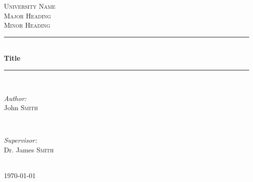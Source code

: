 \documentclass[12pt]{article} %
\begin{document}

\begin{titlepage}

\newcommand{\HRule}{\rule{\linewidth}{0.5mm}} %

\center %

\textsc{\LARGE University Name}\\[1.5cm] %
\textsc{\Large Major Heading}\\[0.5cm] %
\textsc{\large Minor Heading}\\[0.5cm] %

\HRule \\[0.4cm]
{ \huge \bfseries Title}\\[0.4cm] %
\HRule \\[1.5cm]

\begin{minipage}{0.4\textwidth}
\begin{flushleft} \large
\emph{Author:}\\
John \textsc{Smith} %
\end{flushleft}
\end{minipage}
~
\begin{minipage}{0.4\textwidth}
\begin{flushright} \large
\emph{Supervisor:} \\
Dr. James \textsc{Smith} %
\end{flushright}
\end{minipage}\\[4cm]

{\large \today}\\[3cm] %


\vfill %

\end{titlepage}

\end{document}

